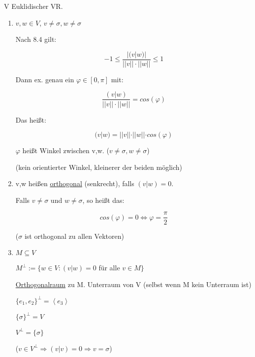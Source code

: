 \documentclass[a4paper, openany]{book}
\begin{document}
        V Euklidischer VR.

        \begin{enumerate}[label=(\alph*)]
          \item $v, w \in V$, $v \neq \sigma, w \neq \sigma$

          Nach 8.4 gilt:

          \begin{equation}
           -1 \le \frac{|(v|w)|}{||v|| \cdot ||w||} \le 1
          \end{equation}

          Dann ex. genau ein $\varphi \in [0, \pi]$ mit:

          \begin{equation}
            \frac{(v|w)}{||v|| \cdot ||w||} = cos(\varphi)
          \end{equation}

          Das heißt:

          \begin{equation} 
            (v|w) = ||v|| \cdot ||w|| \cdot cos(\varphi)
          \end{equation}

          $\varphi$ heißt Winkel zwischen v,w. ($v \neq \sigma, w \neq \sigma$)

          (kein orientierter Winkel, kleinerer der beiden möglich)

          \item v,w heißen \underline{orthogonal} (senkrecht), falls $(v|w) = 0$.

          Falls $v \neq \sigma$ und $w \neq \sigma$, so  heißt das: 

          \begin{equation}
            cos(\varphi) = 0 \Leftrightarrow \varphi = \frac{\pi}{2}
          \end{equation}

          ($\sigma$ ist orthogonal zu allen Vektoren)

          \item $M \subseteq V$

          $M^{\perp} := \{w \in V : (v|w) = 0$ für alle $v \in M \}$

          \underline{Orthogonalraum} zu M. Unterraum von V (selbst wenn M kein Unterraum ist)

          \par \medskip

          $\{e_1, e_2\}^{\perp} = \left \langle e_3 \right \rangle$

          $\{\sigma \}^{\perp} = V$

          $V^{\perp} = \{\sigma\}$

          ($v \in V^{\perp} \Rightarrow (v|v) = 0 \Rightarrow v = \sigma$)
        \end{enumerate}
\end{document}
